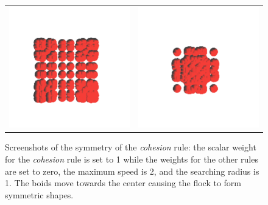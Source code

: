 \begin{figure}[htbp]
\begin{center}
\begin{tabular}{cc}
\includegraphics[scale= 0.5]{figures/coh3.pdf} &
\includegraphics[scale= 0.5]{figures/coh4.pdf}
\end{tabular}
\end{center}
\caption{Screenshots of the symmetry of the \textit{cohesion} rule: the scalar weight for the \textit{cohesion} rule is set to 1 while the weights for the other rules are set to zero, the maximum speed is 2, and the searching radius is 1. The boids move towards the center causing the flock to form symmetric shapes.}
\label{cohRule}
\end{figure}

